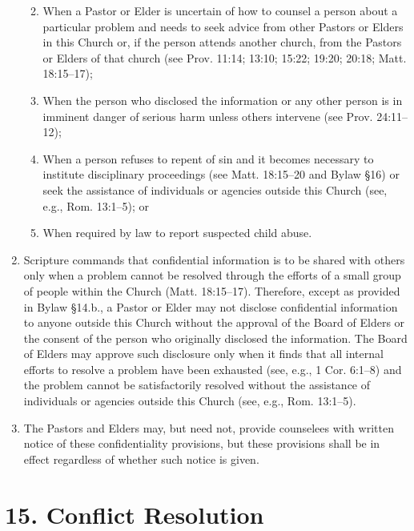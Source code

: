 \documentclass[
]{book}
\providecommand{\tightlist}{%
  \setlength{\itemsep}{0pt}\setlength{\parskip}{0pt}}
\begin{document}
\begin{enumerate}
  \begin{enumerate}
  \def\labelenumii{(\arabic{enumii})}
  \tightlist
  \item
    When a Pastor or Elder is uncertain of how to counsel a person about a particular problem and needs to seek advice from other Pastors or Elders in this Church or, if the person attends another church, from the Pastors or Elders of that church (see Prov. 11:14; 13:10; 15:22; 19:20; 20:18; Matt. 18:15--17);
  \item
    When the person who disclosed the information or any other person is in imminent danger of serious harm unless others intervene (see Prov. 24:11--12);
  \item
    When a person refuses to repent of sin and it becomes necessary to institute disciplinary proceedings (see Matt. 18:15--20 and Bylaw §16) or seek the assistance of individuals or agencies outside this Church (see, e.g., Rom. 13:1--5); or
  \item
    When required by law to report suspected child abuse.
  \end{enumerate}
\item
  Scripture commands that confidential information is to be shared with others only when a problem cannot be resolved through the efforts of a small group of people within the Church (Matt. 18:15--17). Therefore, except as provided in Bylaw §14.b., a Pastor or Elder may not disclose confidential information to anyone outside this Church without the approval of the Board of Elders or the consent of the person who originally disclosed the information. The Board of Elders may approve such disclosure only when it finds that all internal efforts to resolve a problem have been exhausted (see, e.g., 1 Cor. 6:1--8) and the problem cannot be satisfactorily resolved without the assistance of individuals or agencies outside this Church (see, e.g., Rom. 13:1--5).
\item
  The Pastors and Elders may, but need not, provide counselees with written notice of these confidentiality provisions, but these provisions shall be in effect regardless of whether such notice is given.
\end{enumerate}

\hypertarget{conflict-resolution}{%
\section{15. Conflict Resolution}\label{conflict-resolution}}
\end{document}
